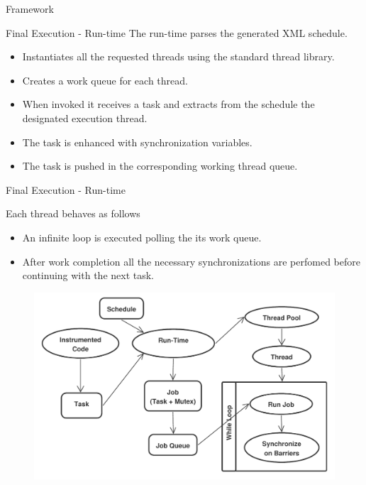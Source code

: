 \documentclass[xcolor=dvipsnames]{beamer}
\begin{document}
\begin{section}{Framework}
\begin{frame}{\hskip 0.3cm Final Execution - Run-time }
The run-time parses the generated XML schedule. 

\begin{itemize}

\item Instantiates all the requested threads using the standard thread library.

\item Creates a work queue for each thread.

\item When invoked it receives a task and extracts from the schedule the designated execution thread.

\item The task is enhanced with synchronization variables.

\item The task is pushed in the corresponding working  thread queue.

\end{itemize}

\end{frame}












\begin{frame}{\hskip 0.3cm Final Execution - Run-time}

Each thread behaves as follows

\begin{itemize}

\item An infinite loop is executed polling the its work queue.

\item After work completion all the necessary synchronizations are perfomed before continuing with the next task.

\end{itemize}

\begin{figure}
\centering
\includegraphics[scale=0.40]{runtime_execution.pdf}
\end{figure}





\end{frame}
\end{section}
\end{document}

